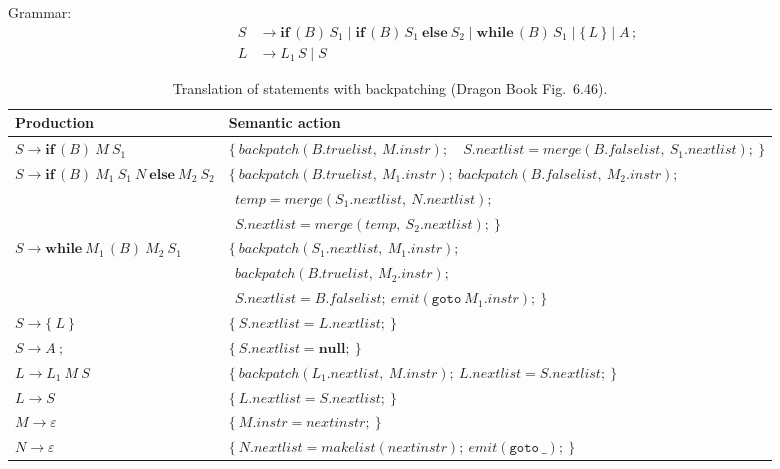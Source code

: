 \documentclass[11pt,a4paper]{article}
\newcommand{\at}[2]{\ensuremath{#1.\mathit{#2}}}
\newcommand{\tok}[1]{\ensuremath{\mathtt{#1}}}
\begin{document}
Grammar:
\begin{align*}
S &\to \mathbf{if}\,(B)\,S_1 \mid \mathbf{if}\,(B)\,S_1\ \mathbf{else}\ S_2 \mid \mathbf{while}\,(B)\,S_1 \mid \{\,L\,\} \mid A\,;\\
L &\to L_1\,S \mid S
\end{align*}
\begin{table}[htbp]
\centering
\small
\begin{tabular}{@{}L{4.3cm} L{10.3cm}@{}}
\toprule
\textbf{Production} & \textbf{Semantic action} \\ \midrule
$S \to \mathbf{if}\,(B)\ M\ S_1$ &
$\{\ \mathit{backpatch}(\at{B}{truelist},\ \at{M}{instr});$\ \ $\at{S}{nextlist}=\mathit{merge}(\at{B}{falselist},\ \at{S_1}{nextlist});\ \}$ \\[3pt]
$S \to \mathbf{if}\,(B)\ M_1\ S_1\ N\ \mathbf{else}\ M_2\ S_2$ &
$\{\ \mathit{backpatch}(\at{B}{truelist},\ \at{M_1}{instr});\ \mathit{backpatch}(\at{B}{falselist},\ \at{M_2}{instr});$\\
& $\ \ \mathit{temp}=\mathit{merge}(\at{S_1}{nextlist},\ \at{N}{nextlist});$\\
& $\ \ \at{S}{nextlist}=\mathit{merge}(\mathit{temp},\ \at{S_2}{nextlist});\ \}$ \\[3pt]
$S \to \mathbf{while}\ M_1\,(B)\ M_2\ S_1$ &
$\{\ \mathit{backpatch}(\at{S_1}{nextlist},\ \at{M_1}{instr});$\\
& $\ \ \mathit{backpatch}(\at{B}{truelist},\ \at{M_2}{instr});$\\
& $\ \ \at{S}{nextlist}=\at{B}{falselist};\ \mathit{emit}(\tok{goto}\ \at{M_1}{instr});\ \}$ \\[3pt]
$S \to \{\ L\ \}$ & $\{\ \at{S}{nextlist}=\at{L}{nextlist};\ \}$ \\[3pt]
$S \to A\ ;$ & $\{\ \at{S}{nextlist}=\mathbf{null};\ \}$ \\[3pt]
$L \to L_1\ M\ S$ & $\{\ \mathit{backpatch}(\at{L_1}{nextlist},\ \at{M}{instr});\ \at{L}{nextlist}=\at{S}{nextlist};\ \}$ \\[3pt]
$L \to S$ & $\{\ \at{L}{nextlist}=\at{S}{nextlist};\ \}$ \\[3pt]
$M \to \varepsilon$ & $\{\ \at{M}{instr}=\mathit{nextinstr};\ \}$ \\[3pt]
$N \to \varepsilon$ & $\{\ \at{N}{nextlist}=\mathit{makelist}(\mathit{nextinstr});\ \mathit{emit}(\tok{goto}\ \_);\ \}$ \\ \bottomrule
\end{tabular}
\caption{Translation of statements with backpatching (Dragon Book Fig.~6.46).}
\end{table}
\end{document}
